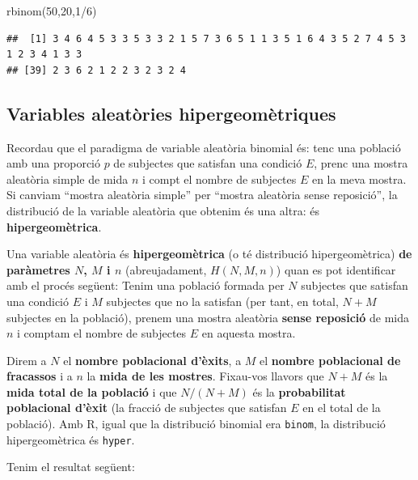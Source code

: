 \documentclass[
]{book}
\newenvironment{Shaded}{\begin{snugshade}}{\end{snugshade}}
\newcommand{\DecValTok}[1]{\textcolor[rgb]{0.00,0.00,0.81}{#1}}
\newcommand{\FunctionTok}[1]{\textcolor[rgb]{0.00,0.00,0.00}{#1}}
\newcommand{\NormalTok}[1]{#1}
\newcommand{\SpecialCharTok}[1]{\textcolor[rgb]{0.00,0.00,0.00}{#1}}
\theoremstyle{definition}
\theoremstyle{definition}
\theoremstyle{definition}
\theoremstyle{remark}
\begin{document}
\begin{Shaded}
\begin{Highlighting}[]
\FunctionTok{rbinom}\NormalTok{(}\DecValTok{50}\NormalTok{,}\DecValTok{20}\NormalTok{,}\DecValTok{1}\SpecialCharTok{/}\DecValTok{6}\NormalTok{)}
\end{Highlighting}
\end{Shaded}

\begin{verbatim}
##  [1] 3 4 6 4 5 3 3 5 3 3 2 1 5 7 3 6 5 1 1 3 5 1 6 4 3 5 2 7 4 5 3 1 2 3 4 1 3 3
## [39] 2 3 6 2 1 2 2 3 2 3 2 4
\end{verbatim}

\hypertarget{variables-aleatuxf2ries-hipergeomuxe8triques}{%
\subsection{Variables aleatòries hipergeomètriques}\label{variables-aleatuxf2ries-hipergeomuxe8triques}}

Recordau que el paradigma de variable aleatòria binomial és: tenc una població amb una proporció \(p\) de subjectes que satisfan una condició \(E\), prenc una mostra aleatòria simple de mida \(n\) i compt el nombre de subjectes \(E\) en la meva mostra. Si canviam ``mostra aleatòria simple'' per ``mostra aleatòria sense reposició'', la distribució de la variable aleatòria que obtenim és una altra: és \textbf{hipergeomètrica}.

Una variable aleatòria és \textbf{hipergeomètrica} (o té distribució hipergeomètrica) \textbf{de paràmetres \(N\), \(M\) i \(n\)} (abreujadament, \(H(N,M,n)\)) quan es pot identificar amb el procés següent: Tenim una població formada per \(N\) subjectes que satisfan una condició \(E\) i \(M\) subjectes que no la satisfan (per tant, en total, \(N+M\) subjectes en la població), prenem una mostra aleatòria \textbf{sense reposició} de mida \(n\) i comptam el nombre de subjectes \(E\) en aquesta mostra.

Direm a \(N\) el \textbf{nombre poblacional d'èxits}, a \(M\) el \textbf{nombre poblacional de fracassos} i a \(n\) la \textbf{mida de les mostres}. Fixau-vos llavors que \(N+M\) és la \textbf{mida total de la població} i que \(N/(N+M)\) és la \textbf{probabilitat poblacional d'èxit} (la fracció de subjectes que satisfan \(E\) en el total de la població). Amb R, igual que la distribució binomial era \texttt{binom}, la distribució hipergeomètrica és \texttt{hyper}.

Tenim el resultat següent:
\end{document}
